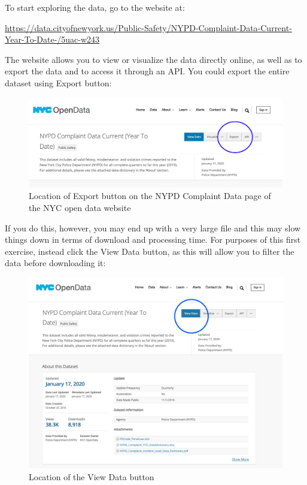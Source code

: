 \documentclass[]{book}
\begin{document}
To start exploring the data, go to the website at:

\url{https://data.cityofnewyork.us/Public-Safety/NYPD-Complaint-Data-Current-Year-To-Date-/5uac-w243}

The website allows you to view or visualize the data directly online, as well as to export the data and to access it through an API. You could export the entire dataset using Export button:

\begin{figure}
\centering
\includegraphics{images/NYPD_CD_main.png}
\caption{Location of Export button on the NYPD Complaint Data page of the NYC open data website}
\end{figure}

If you do this, however, you may end up with a very large file and this may slow things down in terms of download and processing time. For purposes of this first exercise, instead click the View Data button, as this will allow you to filter the data before downloading it:

\begin{figure}
\centering
\includegraphics{images/NYPD_CD_view.png}
\caption{Location of the View Data button}
\end{figure}
\end{document}
